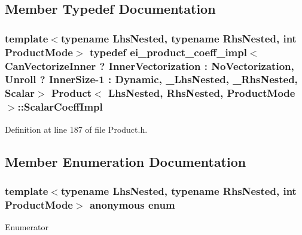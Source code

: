 \subsection{Member Typedef Documentation}
\hypertarget{class_product_a8da86980a3699fb57fea9a803af58708}{
\subsubsection[{Scalar\-Coeff\-Impl}]{\setlength{\rightskip}{0pt plus 5cm}template$<$typename Lhs\-Nested, typename Rhs\-Nested, int Product\-Mode$>$ typedef {\bf ei\-\_\-product\-\_\-coeff\-\_\-impl}$<$Can\-Vectorize\-Inner ? {\bf Inner\-Vectorization} \-: {\bf No\-Vectorization}, Unroll ? {\bf Inner\-Size}-\/1 \-: {\bf Dynamic}, \-\_\-\-Lhs\-Nested, {\bf \-\_\-\-Rhs\-Nested}, {\bf Scalar}$>$ {\bf Product}$<$ Lhs\-Nested, Rhs\-Nested, Product\-Mode $>$\-::{\bf Scalar\-Coeff\-Impl}}}\label{class_product_a8da86980a3699fb57fea9a803af58708}


Definition at line 187 of file Product.\-h.



\subsection{Member Enumeration Documentation}
\hypertarget{class_product_aed4106fbae3137a79eecc0b126eda5c7}{\subsubsection[{anonymous enum}]{\setlength{\rightskip}{0pt plus 5cm}template$<$typename Lhs\-Nested, typename Rhs\-Nested, int Product\-Mode$>$ anonymous enum}}\label{class_product_aed4106fbae3137a79eecc0b126eda5c7}
\begin{Desc}
\item[Enumerator]\par
\begin{description}
\item[{\em 
\hypertarget{class_product_aed4106fbae3137a79eecc0b126eda5c7a6815056433cb21ada8e1d722e096bb30}{Packet\-Size}\label{class_product_aed4106fbae3137a79eecc0b126eda5c7a6815056433cb21ada8e1d722e096bb30}
}]\item[{\em 
\hypertarget{class_product_aed4106fbae3137a79eecc0b126eda5c7abe4ec3b9d5ac4d3adf94d768f994ac8d}{Inner\-Size}\label{class_product_aed4106fbae3137a79eecc0b126eda5c7abe4ec3b9d5ac4d3adf94d768f994ac8d}
}]\end{description}
\end{Desc}


